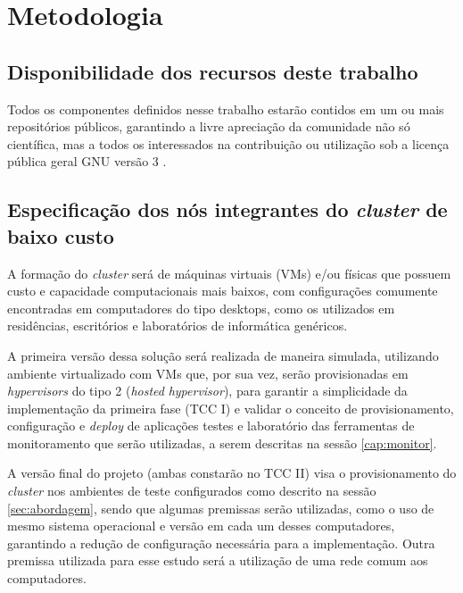 
\chapter{Metodologia}
\label{chap:metodologia}
\section{Disponibilidade dos recursos deste trabalho}
Todos os componentes definidos nesse trabalho estarão contidos em um ou mais repositórios públicos, garantindo a livre apreciação da comunidade não só científica, mas a todos os interessados na contribuição ou utilização sob a licença pública geral GNU versão 3 \cite{foss2022}.

\section{Especificação dos nós integrantes do  \emph{cluster} de baixo custo}

A formação do  \emph{cluster} será de máquinas virtuais (VMs) e/ou físicas que possuem custo e capacidade computacionais mais baixos, com configurações comumente encontradas em computadores do tipo desktops, como os utilizados em residências, escritórios e laboratórios de informática genéricos.

A primeira versão dessa solução será realizada de maneira simulada, utilizando ambiente virtualizado com VMs que, por sua vez, serão provisionadas em \emph{hypervisors} do tipo 2 \cite{comer_cloud_2021} (\emph{hosted} \emph{hypervisor}), para garantir a simplicidade da implementação da primeira fase (TCC I) e validar o conceito de provisionamento, configuração e \emph{deploy} de aplicações testes e laboratório das ferramentas de monitoramento que serão utilizadas, a serem descritas na sessão \ref{cap:monitor}. 

A versão final do projeto (ambas constarão no TCC II) visa o provisionamento do  \emph{cluster} nos ambientes de teste configurados como descrito na sessão \ref{sec:abordagem}, sendo que algumas premissas serão utilizadas, como o uso de mesmo sistema operacional e versão em cada um desses computadores, garantindo a redução de configuração necessária para a implementação. Outra premissa utilizada para esse estudo será a utilização de uma rede comum aos computadores. 

